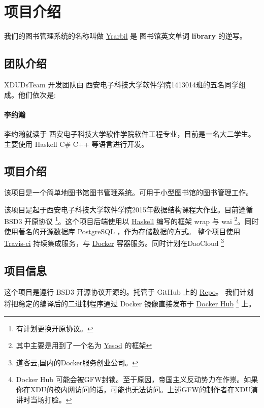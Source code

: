 

\section*{项目介绍}
我们的图书管理系统的名称叫做 \href{http://yrarbil.iok.la}{Yrarbil} 是 图书馆英文单词 \textbf{library} 的逆写。
\subsection*{团队介绍}
XDUDsTeam 开发团队由 西安电子科技大学软件学院1413014班的五名同学组成。他们依次是:
\paragraph{李约瀚} 李约瀚就读于 西安电子科技大学软件学院软件工程专业，目前是一名大二学生。
主要使用 Haskell C\# C++ 等语言进行开发。
\subsection*{项目介绍}
该项目是一个简单地图书馆图书管理系统。可用于小型图书馆的图书管理工作。

该项目是起于西安电子科技大学软件学院2015年数据结构课程大作业。目前遵循 BSD3 开原协议 \footnote{有计划更换开原协议。}。这个项目后端使用以 \href{https://www.haskell.org}{Haskell} 编写的框架 wrap 与 wai \footnote{其中主要是用到了一个名为 \href{https://www.yesodweb.com}{Yesod} 的框架}。同时使用著名的开源数据库
\href{http://www.postgresql.org}{PostgreSQL} ，作为存储数据的方式。
整个项目使用 \href{https://travis-ci.org}{Travis-ci} 持续集成服务，与 \href{https://www.docker.com/}{Docker} 容器服务。同时计划在DaoCloud \footnote{道客云,国内的Docker服务创业公司。}
\subsection*{项目信息}
这个项目是遵行 BSD3 开源协议开源的。托管于 GitHub 上的   \href{https://github.com/XDUDsTeam/}{Repo}。
我们计划将把稳定的编译后的二进制程序通过 Docker 镜像直接发布于
\href{https://hub.docker.com/}{Docker Hub}
\footnote{Docker Hub 可能会被GFW封锁。\tiny{至于原因，帝国主义反动势力在作祟。}如果你在XDU的校内网访问的话，可能也无法访问。上述GFW的制作者在XDU演讲时当场打脸。}
上。